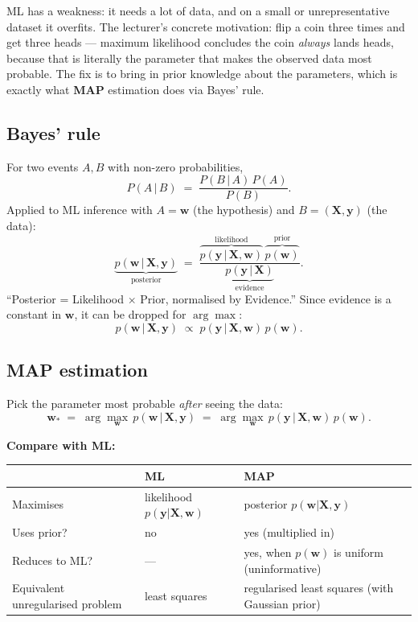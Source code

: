 \documentclass[11pt, a4paper]{article}
\newcommand{\thead}[1]{\textbf{#1}}
\begin{document}
ML has a weakness: it needs a lot of data, and on a small or unrepresentative dataset it overfits. The lecturer's concrete motivation: flip a coin three times and get three heads — maximum likelihood concludes the coin \emph{always} lands heads, because that is literally the parameter that makes the observed data most probable. The fix is to bring in prior knowledge about the parameters, which is exactly what \textbf{MAP} estimation does via Bayes' rule.

\subsection{Bayes' rule}

\begin{defbox}
For two events $A, B$ with non-zero probabilities,
\[
P(A\,|\,B) \;=\; \frac{P(B\,|\,A)\,P(A)}{P(B)}.
\]
Applied to ML inference with $A = \mathbf{w}$ (the hypothesis) and $B = (\mathbf{X},\mathbf{y})$ (the data):
\[
\underbrace{p(\mathbf{w}\,|\,\mathbf{X},\mathbf{y})}_{\text{posterior}} \;=\; \frac{\overbrace{p(\mathbf{y}\,|\,\mathbf{X},\mathbf{w})}^{\text{likelihood}}\,\overbrace{p(\mathbf{w})}^{\text{prior}}}{\underbrace{p(\mathbf{y}\,|\,\mathbf{X})}_{\text{evidence}}}.
\]
``Posterior = Likelihood $\times$ Prior, normalised by Evidence.'' Since evidence is a constant in $\mathbf{w}$, it can be dropped for $\arg\max$:
\[
p(\mathbf{w}\,|\,\mathbf{X},\mathbf{y}) \;\propto\; p(\mathbf{y}\,|\,\mathbf{X},\mathbf{w})\,p(\mathbf{w}).
\]
\end{defbox}

\subsection{MAP estimation}

\begin{defbox}
Pick the parameter most probable \emph{after} seeing the data:
\[
\mathbf{w}_* \;=\; \arg\max_\mathbf{w}\, p(\mathbf{w}\,|\,\mathbf{X},\mathbf{y}) \;=\; \arg\max_\mathbf{w}\, p(\mathbf{y}\,|\,\mathbf{X},\mathbf{w})\,p(\mathbf{w}).
\]
\end{defbox}

\textbf{Compare with ML:}

\begin{tabularx}{\linewidth}{@{}lXX@{}}
\toprule
& \thead{ML} & \thead{MAP} \\
\midrule
Maximises    & likelihood $p(\mathbf{y}|\mathbf{X},\mathbf{w})$       & posterior $p(\mathbf{w}|\mathbf{X},\mathbf{y})$ \\
Uses prior?  & no                                                    & yes (multiplied in) \\
Reduces to ML? & —                                                    & yes, when $p(\mathbf{w})$ is uniform (uninformative) \\
Equivalent unregularised problem & least squares                     & regularised least squares (with Gaussian prior) \\
\bottomrule
\end{tabularx}
\end{document}
